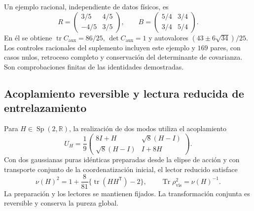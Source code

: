 Un ejemplo racional, independiente de datos físicos, es
\begin{equation}
 R=\begin{pmatrix}3/5&4/5\\-4/5&3/5\end{pmatrix},\qquad
 B=\begin{pmatrix}5/4&3/4\\3/4&5/4\end{pmatrix}.
 \label{md:aux:ejemplo-racional}
\end{equation}
En él se obtiene $\operatorname{tr}C_{\mathrm{aux}}=86/25$,
$\det C_{\mathrm{aux}}=1$ y autovalores
$(43\pm6\sqrt{34})/25$. Los controles racionales del suplemento
incluyen este ejemplo y $169$ pares, con casos nulos, retroceso
completo y conservación del determinante de covarianza. Son
comprobaciones finitas de las identidades demostradas.

\subsection{Acoplamiento reversible y lectura reducida de entrelazamiento}
\label{md:aux:acoplamiento}

Para $H\in\operatorname{Sp}(2,\mathbb R)$, la realización de dos
modos utiliza el acoplamiento
\begin{equation}
 U_H=\frac19\begin{pmatrix}
 8I+H&\sqrt8(H-I)\\
 \sqrt8(H-I)&I+8H
 \end{pmatrix}.
 \label{md:aux:acoplamiento-uh}
\end{equation}
Con dos gaussianas puras idénticas preparadas desde la elipse de
acción y con transporte conjunto de la coordenatización inicial, el lector
reducido satisface
\begin{equation}
 \nu(H)^2=1+\frac8{81}
    \bigl\{\operatorname{tr}(HH^{\mathsf T})-2\bigr\},
 \qquad\operatorname{Tr}\rho_{\mathrm{vis}}^2=\nu(H)^{-1}.
 \label{md:aux:mezcla-generica}
\end{equation}
La preparación y los lectores se mantienen fijados. La
transformación conjunta es reversible y conserva la pureza global.

